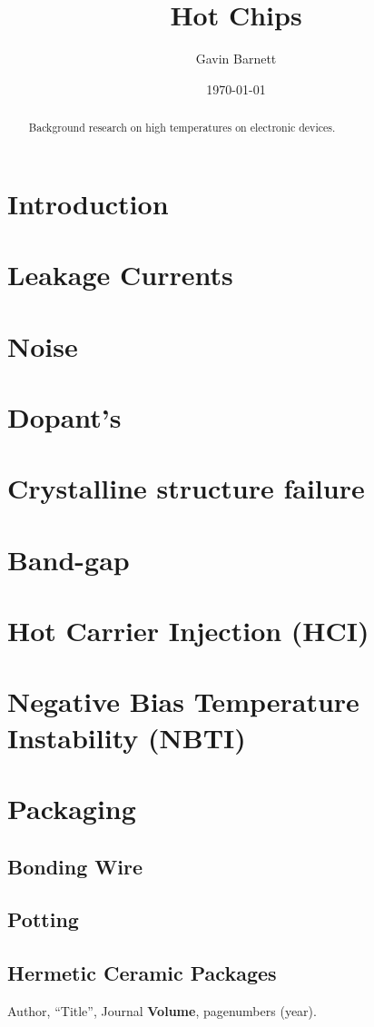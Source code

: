 \documentclass{article}
\title{Hot Chips}
\author{Gavin Barnett}
\date{\today}
\begin{document}
\maketitle

\begin{abstract}
Background research on high temperatures on electronic devices.

\end{abstract}
\maketitle

\tableofcontents

\section{Introduction}

\section{Leakage Currents}

\section{Noise}

\section{Dopant's}

\section{Crystalline structure failure}

\section{Band-gap}

\section{Hot Carrier Injection (HCI)}

\section{Negative Bias Temperature Instability (NBTI)}

\section{Packaging}
\subsection{Bonding Wire}
\subsection{Potting}
\subsection{Hermetic Ceramic Packages}


\begin{thebibliography}{1}
Author, ``Title'', Journal \textbf{Volume},
page\textendash numbers (year).
\end{thebibliography}
\end{document}

